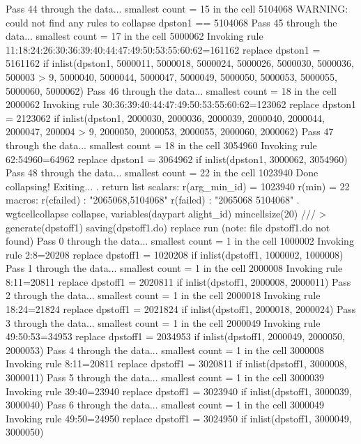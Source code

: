 Pass 44 through the data...
  smallest count = 15 in the cell      5104068
  WARNING: could not find any rules to collapse dpston1 == 5104068
Pass 45 through the data...
  smallest count = 17 in the cell      5000062
  Invoking rule 11:18:24:26:30:36:39:40:44:47:49:50:53:55:60:62=161162
  replace dpston1 = 5161162 if inlist(dpston1, 5000011, 5000018, 5000024, 5000026, 5000030, 5000036, 500003
> 9, 5000040, 5000044, 5000047, 5000049, 5000050, 5000053, 5000055, 5000060, 5000062)
Pass 46 through the data...
  smallest count = 18 in the cell      2000062
  Invoking rule 30:36:39:40:44:47:49:50:53:55:60:62=123062
  replace dpston1 = 2123062 if inlist(dpston1, 2000030, 2000036, 2000039, 2000040, 2000044, 2000047, 200004
> 9, 2000050, 2000053, 2000055, 2000060, 2000062)
Pass 47 through the data...
  smallest count = 18 in the cell      3054960
  Invoking rule 62:54960=64962
  replace dpston1 = 3064962 if inlist(dpston1, 3000062, 3054960)
Pass 48 through the data...
  smallest count = 22 in the cell      1023940
  Done collapsing! Exiting...
{\smallskip}
. return list
{\smallskip}
scalars:
         r(arg_min_id) =  1023940
                r(min) =  22
{\smallskip}
macros:
            r(cfailed) : "2065068,5104068"
             r(failed) : "2065068 5104068"
{\smallskip}
. wgtcellcollapse collapse, variables(daypart alight_id) mincellsize(20) ///
>         generate(dpstoff1) saving(dpstoff1.do) replace run
(note: file dpstoff1.do not found)
Pass 0 through the data...
  smallest count = 1 in the cell      1000002
  Invoking rule 2:8=20208
  replace dpstoff1 = 1020208 if inlist(dpstoff1, 1000002, 1000008)
Pass 1 through the data...
  smallest count = 1 in the cell      2000008
  Invoking rule 8:11=20811
  replace dpstoff1 = 2020811 if inlist(dpstoff1, 2000008, 2000011)
Pass 2 through the data...
  smallest count = 1 in the cell      2000018
  Invoking rule 18:24=21824
  replace dpstoff1 = 2021824 if inlist(dpstoff1, 2000018, 2000024)
Pass 3 through the data...
  smallest count = 1 in the cell      2000049
  Invoking rule 49:50:53=34953
  replace dpstoff1 = 2034953 if inlist(dpstoff1, 2000049, 2000050, 2000053)
Pass 4 through the data...
  smallest count = 1 in the cell      3000008
  Invoking rule 8:11=20811
  replace dpstoff1 = 3020811 if inlist(dpstoff1, 3000008, 3000011)
Pass 5 through the data...
  smallest count = 1 in the cell      3000039
  Invoking rule 39:40=23940
  replace dpstoff1 = 3023940 if inlist(dpstoff1, 3000039, 3000040)
Pass 6 through the data...
  smallest count = 1 in the cell      3000049
  Invoking rule 49:50=24950
  replace dpstoff1 = 3024950 if inlist(dpstoff1, 3000049, 3000050)

